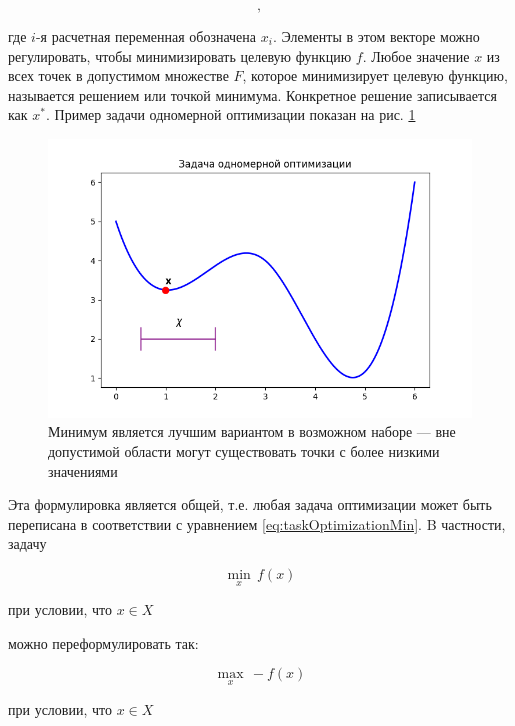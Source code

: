 \begin{equation}
    [x_1,x_2,...,x_n],
	\label{eq:arrayX}
\end{equation}

где $i$-я расчетная переменная обозначена $x_i$. Элементы в этом векторе можно регулировать, чтобы минимизировать целевую функцию $f$. \cite{kochenderfer2020optimization} Любое значение $x$ из всех точек в допустимом множестве $F$, которое минимизирует целевую функцию, называется решением или точкой минимума. Конкретное решение записывается как $x^*$. Пример задачи одномерной оптимизации показан на рис. \ref{fig:figure_1}

\begin{figure}[ht]
 \centering
		\includegraphics[height =7 cm, keepaspectratio]{../assets/images/Figure_1.png}
		\caption{Минимум является лучшим вариантом в возможном наборе —
вне допустимой области могут существовать точки с более низкими значениями
}
\label{fig:figure_1}
	\end{figure}

Эта формулировка является общей, т.е. любая задача оптимизации может быть переписана в соответствии с уравнением \eqref{eq:taskOptimizationMin}. B частности, задачу

\begin{equation}
  \min_{x} \, f(x) 
\end{equation}

\begin{center}
при условии, что $x \in X$
\end{center}

можно переформулировать так:

\begin{equation}
  \max_{x} \, -f(x) 
  \label{eq:TaskOptimizationMax}
\end{equation}

 \begin{center}
 при условии, что $x \in X$
 \end{center}
 
